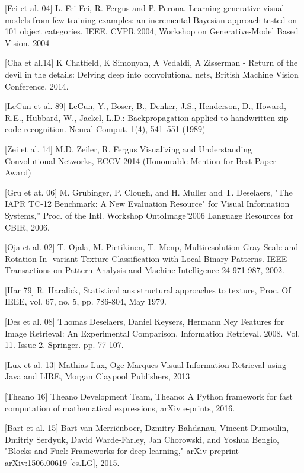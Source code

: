 [Fei et al. 04] L. Fei-Fei, R. Fergus and P. Perona. Learning generative visual models from few training examples: an incremental Bayesian approach tested on 101 object categories. IEEE. CVPR 2004, Workshop on Generative-Model Based Vision. 2004

[Cha et al.14] K Chatfield, K Simonyan, A Vedaldi, A Zisserman - Return of the devil in the details: Delving deep into convolutional nets, British Machine Vision Conference, 2014.




[LeCun et al. 89] LeCun, Y., Boser, B., Denker, J.S., Henderson, D., Howard, R.E., Hubbard, W., Jackel, L.D.: Backpropagation applied to handwritten zip code recognition. Neural
Comput. 1(4), 541–551 (1989)

[Zei et al. 14] M.D. Zeiler, R. Fergus Visualizing and Understanding Convolutional Networks, ECCV 2014 (Honourable Mention for Best Paper Award)

[Gru et at. 06] M. Grubinger, P. Clough, and H. Muller and T. Deselaers, "The IAPR TC-12 Benchmark: A New Evaluation Resource" for Visual Information Systems,” Proc. of the Intl. Workshop OntoImage’2006 Language Resources for CBIR, 2006.



[Oja et al. 02] T. Ojala, M. Pietikinen, T. Menp, Multiresolution Gray-Scale and Rotation In-
variant Texture Classification with Local Binary Patterns. IEEE Transactions on
Pattern Analysis and Machine Intelligence 24 971 987, 2002.

[Har 79] R. Haralick, Statistical ans structural approaches to texture, Proc. Of IEEE, vol.
67, no. 5, pp. 786-804, May 1979.

[Des et al. 08] Thomas Deselaers, Daniel Keysers, Hermann Ney Features for Image Retrieval: An Experimental Comparison. Information Retrieval. 2008. Vol. 11. Issue 2. Springer. pp. 77-107.

[Lux et al. 13] Mathias Lux, Oge Marques Visual Information Retrieval using Java and LIRE, Morgan Claypool Publishers, 2013


[Theano 16] Theano Development Team, Theano: A {Python} framework for fast computation of mathematical expressions, arXiv e-prints, 2016.

[Bart et al. 15] Bart van Merriënboer, Dzmitry Bahdanau, Vincent Dumoulin, Dmitriy Serdyuk, David Warde-Farley, Jan Chorowski, and Yoshua Bengio, "Blocks and Fuel: Frameworks for deep learning," arXiv preprint arXiv:1506.00619 [cs.LG], 2015.
